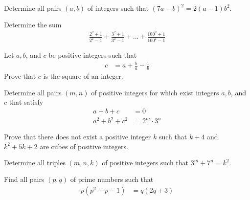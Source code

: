 \begin{problem}
	Determine all pairs $(a, b)$ of integers such that $(7a - b)^2 = 2(a - 1)b^2$.
\end{problem}

\begin{problem}
	Determine the sum
	\begin{align*}
		\frac{2^2+1}{2^2-1} + \frac{3^2+1}{3^2-1} + \dots + \frac{100^2+1}{100^2-1}
	\end{align*}
\end{problem}

\begin{problem}
	Let $a,b$, and $c$ be positive integers such that
	\begin{align*}
		c &= a + \frac{b}{a} - \frac{1}{b}
	\end{align*}
	Prove that $c$ is the square of an integer.
\end{problem}

\begin{problem}
	Determine all pairs $(m, n)$ of positive integers for which exist integers $a, b$, and $c$ that satisfy
	\begin{align*}
		a+b+c
			& =0\\
		a^2+b^2+c^2
			& =2^m \cdot 3^n
	\end{align*}
\end{problem}

\begin{problem}
	Prove that there does not exist a positive integer $k$ such that $k + 4$ and $k^2 + 5k + 2$ are cubes of positive integers.
\end{problem}

\begin{problem}
	Determine all triples $(m, n, k)$ of positive integers such that $3^m + 7^n = k^2$.
\end{problem}

\begin{problem}
	Find all pairs $(p,q)$ of prime numbers such that
		\begin{align*}
			p(p^2 - p - 1)
				& = q(2q + 3)
		\end{align*}
\end{problem}

